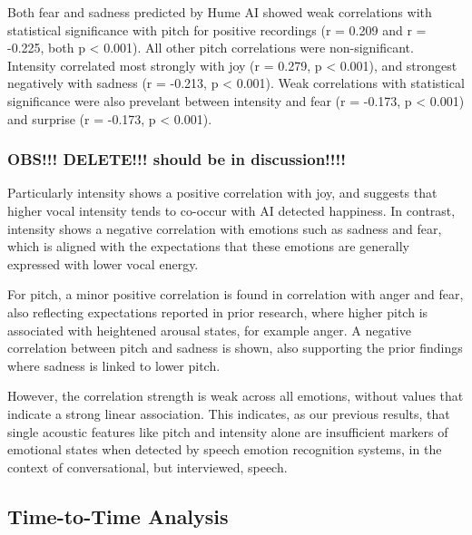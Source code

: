 Both fear and sadness predicted by Hume AI showed weak correlations with statistical significance with pitch for positive recordings (r = 0.209 and r = -0.225, both p < 0.001). All other pitch correlations were non-significant. 
Intensity correlated most strongly with joy (r = 0.279, p < 0.001), and strongest negatively with sadness (r = -0.213, p < 0.001). Weak correlations with statistical significance were also prevelant between intensity and fear (r = -0.173, p < 0.001) and surprise (r = -0.173, p < 0.001).


\subsubsection{OBS!!! DELETE!!! should be in discussion!!!! }


Particularly intensity shows a positive correlation with joy, and suggests that higher vocal intensity tends to co-occur with AI detected happiness. In contrast, intensity shows a negative correlation with emotions such as sadness and fear, which is aligned with the expectations that these emotions are generally expressed with lower vocal energy. 

For pitch, a minor positive correlation is found in correlation with anger and fear, also reflecting expectations reported in prior research, where higher pitch is associated with heightened arousal states, for example anger. A negative correlation between pitch and sadness is shown, also supporting the prior findings where sadness is linked to lower pitch. 

However, the correlation strength is weak across all emotions, without values that indicate a strong linear association. This indicates, as our previous results, that single acoustic features like pitch and intensity alone are insufficient markers of emotional states when detected by speech emotion recognition systems, in the context of conversational, but interviewed, speech. 

\subsection{Time-to-Time Analysis}


